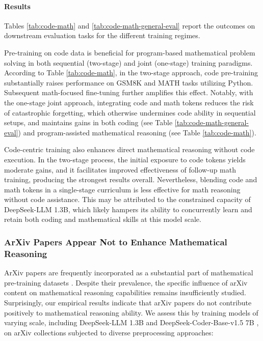 \paragraph{Results}
Tables \ref{tab:code-math} and \ref{tab:code-math-general-eval} report the outcomes on downstream evaluation tasks for the different training regimes.

Pre-training on code data is beneficial for program-based mathematical problem solving in both sequential (two-stage) and joint (one-stage) training paradigms. According to Table \ref{tab:code-math}, in the two-stage approach, code pre-training substantially raises performance on GSM8K and MATH tasks utilizing Python. Subsequent math-focused fine-tuning further amplifies this effect. Notably, with the one-stage joint approach, integrating code and math tokens reduces the risk of catastrophic forgetting, which otherwise undermines code ability in sequential setups, and maintains gains in both coding (see Table \ref{tab:code-math-general-eval}) and program-assisted mathematical reasoning (see Table \ref{tab:code-math}).

Code-centric training also enhances direct mathematical reasoning without code execution. In the two-stage process, the initial exposure to code tokens yields moderate gains, and it facilitates improved effectiveness of follow-up math training, producing the strongest results overall. Nevertheless, blending code and math tokens in a single-stage curriculum is less effective for math reasoning without code assistance. This may be attributed to the constrained capacity of DeepSeek-LLM 1.3B, which likely hampers its ability to concurrently learn and retain both coding and mathematical skills at this model scale.

\subsubsection{ArXiv Papers Appear Not to Enhance Mathematical Reasoning}

ArXiv papers are frequently incorporated as a substantial part of mathematical pre-training datasets \citep{minerva,gpt-f,llemma,mathpile}. Despite their prevalence, the specific influence of arXiv content on mathematical reasoning capabilities remains insufficiently studied. Surprisingly, our empirical results indicate that arXiv papers do not contribute positively to mathematical reasoning ability. We assess this by training models of varying scale, including DeepSeek-LLM 1.3B and DeepSeek-Coder-Base-v1.5 7B \citep{deepseek-coder}, on arXiv collections subjected to diverse preprocessing approaches:

